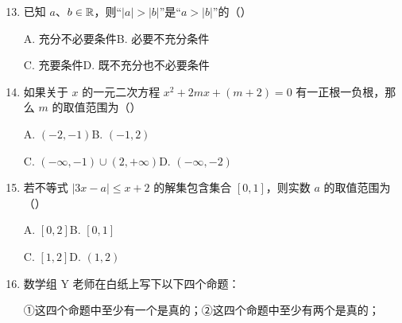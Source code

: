 \documentclass[a4paper,11pt]{article}
\begin{document}
\begin{enumerate}
\setcounter{enumi}{12}

\item 已知 $a$、$b\in\mathbb{R}$，则“$|a|>|b|$”是“$a>|b|$”的\mbox{（\quad）}

\keepwithprev
A. 充分不必要条件\qquad B. 必要不充分条件

C. 充要条件\qquad D. 既不充分也不必要条件

\ifanswer
{}
\fi

\item 如果关于 $x$ 的一元二次方程 $x^2+2mx+(m+2)=0$ 有一正根一负根，那么 $m$ 的取值范围为\mbox{（\quad）}

\keepwithprev
A. $(-2,-1)$\qquad B. $(-1,2)$

C. $(-\infty,-1)\cup(2,+\infty)$\qquad D. $(-\infty,-2)$

\ifanswer
\solbegin
{}
\solend
\fi

\item 若不等式 $|3x-a|\leqslant x+2$ 的解集包含集合 $[0,1]$，则实数 $a$ 的取值范围为\mbox{（\quad）}

\keepwithprev
A. $[0,2]$\qquad B. $[0,1]$

C. $[1,2]$\qquad D. $(1,2)$

\ifanswer
\solbegin
\solend
\fi

\item 数学组 Y 老师在白纸上写下以下四个命题：

①这四个命题中至少有一个是真的；②这四个命题中至少有两个是真的；


\end{enumerate}
\end{document}
